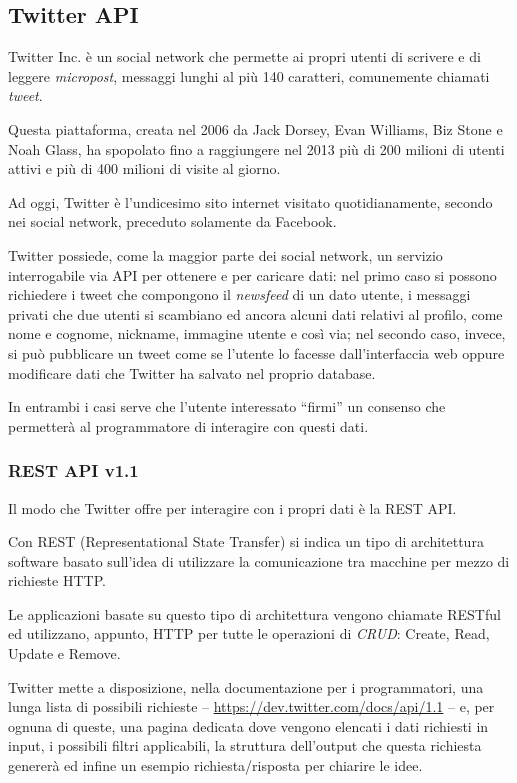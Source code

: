 \subsection{Twitter API}
	Twitter Inc. è un social network che permette ai propri utenti di scrivere e di leggere \emph{micropost}, messaggi lunghi al più 140 caratteri, comunemente chiamati \emph{tweet}. 

	Questa piattaforma, creata nel 2006 da Jack Dorsey, Evan Williams, Biz Stone e Noah Glass, ha spopolato fino a raggiungere nel 2013 più di 200 milioni di utenti attivi e più di 400 milioni di visite al giorno\cite{twitter_data}.

	Ad oggi, Twitter è l'undicesimo sito internet visitato quotidianamente, secondo nei social network, preceduto solamente da Facebook\cite{twitter_alexa}.

	Twitter possiede, come la maggior parte dei social network, un servizio interrogabile via API per ottenere e per caricare dati: nel primo caso si possono richiedere i tweet che compongono il \emph{newsfeed} di un dato utente, i messaggi privati che due utenti si scambiano ed ancora alcuni dati relativi al profilo, come nome e cognome, nickname, immagine utente e così via; nel secondo caso, invece, si può pubblicare un tweet come se l'utente lo facesse dall'interfaccia web oppure modificare dati che Twitter ha salvato nel proprio database. 

	In entrambi i casi serve che l'utente interessato ``firmi'' un consenso che permetterà al programmatore di interagire con questi dati. 

	\subsubsection{REST API v1.1}
		Il modo che Twitter offre per interagire con i propri dati è la REST API. 
	
		Con REST (Representational State Transfer) si indica un tipo di architettura software basato sull'idea di utilizzare la comunicazione tra macchine per mezzo di richieste HTTP.

		Le applicazioni basate su questo tipo di architettura vengono chiamate RESTful ed utilizzano, appunto, HTTP per tutte le operazioni di \emph{CRUD}: Create, Read, Update e Remove.

		Twitter mette a disposizione, nella documentazione per i programmatori\cite{twitter_doc}, una lunga lista di possibili richieste -- \url{https://dev.twitter.com/docs/api/1.1} -- e, per ognuna di queste, una pagina dedicata dove vengono elencati i dati richiesti in input, i possibili filtri applicabili, la struttura dell'output che questa richiesta genererà ed infine un esempio richiesta/risposta per chiarire le idee.

